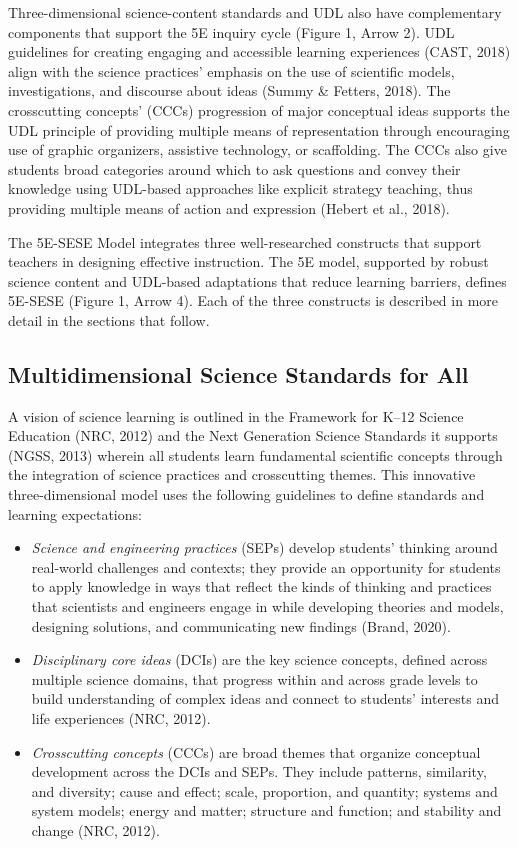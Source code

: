 \documentclass[11.5pt]{sig-alternate} %
\begin{document}
\begin{large}
Three-dimensional science-content standards and UDL also have complementary components that support the 5E inquiry cycle (Figure 1, Arrow 2). UDL guidelines for creating engaging and accessible learning experiences (CAST, 2018) align with the science practices’ emphasis on the use of scientific models, investigations, and discourse about ideas (Summy \& Fetters, 2018). The crosscutting concepts’ (CCCs) progression of major conceptual ideas supports the UDL principle of providing multiple means of representation through encouraging use of graphic organizers, assistive technology, or scaffolding. The CCCs also give students broad categories around which to ask questions and convey their knowledge using UDL-based approaches like explicit strategy teaching, thus providing multiple means of action and expression (Hebert et al., 2018).

The 5E-SESE Model integrates three well-re\-searched constructs that support teachers in designing effective instruction. The 5E model, supported by robust science content and UDL-based adaptations that reduce learning barriers, defines 5E-SESE (Figure 1, Arrow 4). Each of the three constructs is described in more detail in the sections that follow.

\subsection*{Multidimensional Science Standards for All}

A vision of science learning is outlined in the Framework for K–12 Science Education (NRC, 2012) and the Next Generation Science Standards it supports (NGSS, 2013) wherein all students learn fundamental scientific concepts through the integration of science practices and crosscutting themes. This innovative three-di\-mensional model uses the following guidelines to define standards and learning expectations:

\begin{itemize}
    \item \textit{Science and engineering practices} (SEPs) develop students’ thinking around real-world challenges and contexts; they provide an opportunity for students to apply knowledge in ways that reflect the kinds of thinking and practices that scientists and engineers engage in while developing theories and models, designing solutions, and communicating new findings (Brand, 2020).
    \item \textit{Disciplinary core ideas} (DCIs) are the key science concepts, defined across multiple science domains, that progress within and across grade levels to build understanding of complex ideas and connect to students’ interests and life experiences (NRC, 2012).
    \item \textit{Crosscutting concepts} (CCCs) are broad themes that organize conceptual development across the DCIs and SEPs. They include patterns, similarity, and diversity; cause and effect; scale, proportion, and quantity; systems and system models; energy and matter; structure and function; and stability and change (NRC, 2012).
\end{itemize}


\end{large}
\end{document}
